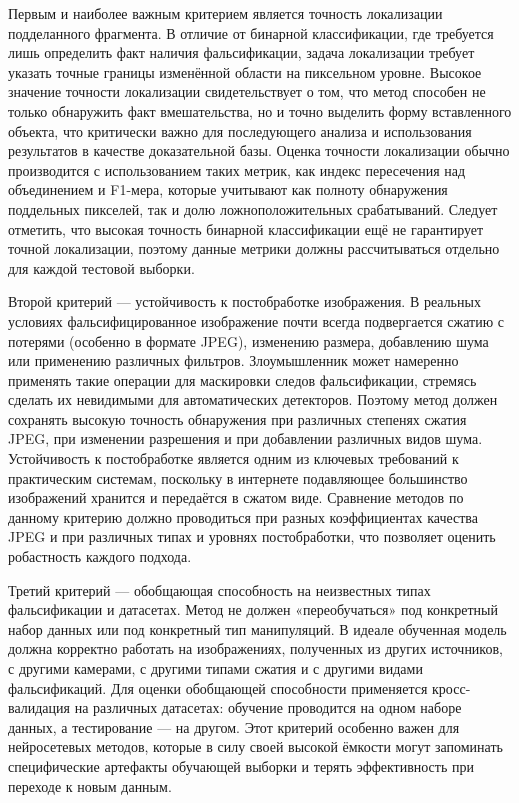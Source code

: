 Первым и наиболее важным критерием является точность локализации подделанного фрагмента. В отличие от бинарной классификации, где требуется лишь определить факт наличия фальсификации, задача локализации требует указать точные границы изменённой области на пиксельном уровне. Высокое значение точности локализации свидетельствует о том, что метод способен не только обнаружить факт вмешательства, но и точно выделить форму вставленного объекта, что критически важно для последующего анализа и использования результатов в качестве доказательной базы. Оценка точности локализации обычно производится с использованием таких метрик, как индекс пересечения над объединением и F1-мера, которые учитывают как полноту обнаружения поддельных пикселей, так и долю ложноположительных срабатываний. Следует отметить, что высокая точность бинарной классификации ещё не гарантирует точной локализации, поэтому данные метрики должны рассчитываться отдельно для каждой тестовой выборки.

Второй критерий — устойчивость к постобработке изображения. В реальных условиях фальсифицированное изображение почти всегда подвергается сжатию с потерями (особенно в формате JPEG), изменению размера, добавлению шума или применению различных фильтров. Злоумышленник может намеренно применять такие операции для маскировки следов фальсификации, стремясь сделать их невидимыми для автоматических детекторов. Поэтому метод должен сохранять высокую точность обнаружения при различных степенях сжатия JPEG, при изменении разрешения и при добавлении различных видов шума. Устойчивость к постобработке является одним из ключевых требований к практическим системам, поскольку в интернете подавляющее большинство изображений хранится и передаётся в сжатом виде. Сравнение методов по данному критерию должно проводиться при разных коэффициентах качества JPEG и при различных типах и уровнях постобработки, что позволяет оценить робастность каждого подхода.

Третий критерий — обобщающая способность на неизвестных типах фальсификации и датасетах. Метод не должен «переобучаться» под конкретный набор данных или под конкретный тип манипуляций. В идеале обученная модель должна корректно работать на изображениях, полученных из других источников, с другими камерами, с другими типами сжатия и с другими видами фальсификаций. Для оценки обобщающей способности применяется кросс-валидация на различных датасетах: обучение проводится на одном наборе данных, а тестирование — на другом. Этот критерий особенно важен для нейросетевых методов, которые в силу своей высокой ёмкости могут запоминать специфические артефакты обучающей выборки и терять эффективность при переходе к новым данным.

